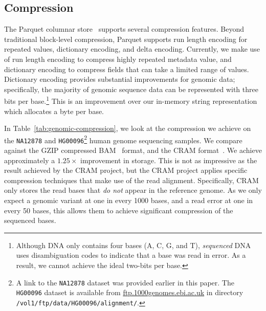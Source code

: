 \documentclass[masters]{ucbthesis}
\begin{document}
\subsection{Compression}
\label{sec:compression}

The Parquet columnar store~\cite{parquet} supports several compression features. Beyond traditional block-level
compression, Parquet supports run length encoding for repeated values, dictionary encoding, and delta
encoding. Currently, we make use of run length encoding to compress highly repeated metadata value,
and dictionary encoding to compress fields that can take a limited range of values. Dictionary encoding provides
substantial improvements for genomic data; specifically, the majority of genomic sequence data can be
represented with three bits per base.\footnote{Although DNA only contains four bases (A, C, G, and T),
\emph{sequenced} DNA uses disambiguation codes to indicate that a base was read in error. As a result, we
cannot achieve the ideal two-bits per base.} This is an improvement over our in-memory string representation
which allocates a byte per base.

In Table~\ref{tab:genomic-compression}, we look at the compression we achieve on the \texttt{NA12878}
and \texttt{HG00096}\footnote{A link to the \texttt{NA12878} dataset was provided earlier in this paper. The
\texttt{HG00096} dataset is available from \url{ftp.1000genomes.ebi.ac.uk} in directory 
\texttt{/vol1/ftp/data/HG00096/alignment/}.} human genome sequencing samples. We compare against the
GZIP compressed BAM~\cite{li09} format, and the CRAM format~\cite{fritz11}. We achieve approximately a
$1.25\times$ improvement in storage. This is not as impressive as the result achieved by the CRAM project,
but the CRAM project applies specific compression techniques that make use of the read alignment. Specifically,
CRAM only stores the read bases that \emph{do not} appear in the reference genome. As we only expect a
genomic variant at one in every 1000 bases, and a read error at one in every 50 bases, this allows them to
achieve significant compression of the sequenced bases.
\end{document}
